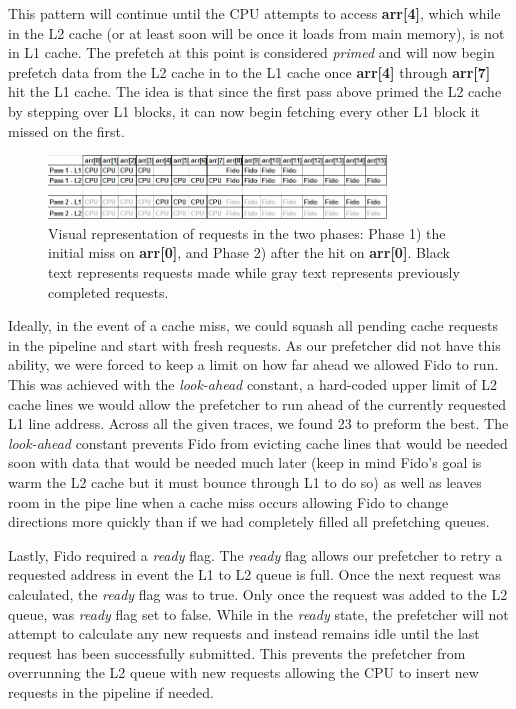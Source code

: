 \documentclass[11pt]{article}
\begin{document}
This pattern will continue until the CPU attempts to access \textbf{arr[4]}, which while in the L2 cache (or at least soon will be once it loads from main memory), is not in L1 cache. The prefetch at this point is considered \textit{primed} and will now begin prefetch data from the L2 cache in to the L1 cache once \textbf{arr[4]} through \textbf{arr[7]} hit the L1 cache. The idea is that since the first pass above primed the L2 cache by stepping over L1 blocks, it can now begin fetching every other L1 block it missed on the first.   
  
\begin{figure}[H]
\centering
\includegraphics[width=0.8\textwidth]{FidoExample.jpg}
\caption{\label{FidoEx}Visual representation of requests in the two phases: Phase 1) the initial miss on \textbf{arr[0]}, and Phase 2) after the hit on \textbf{arr[0]}. Black text represents requests made while gray text represents previously completed requests. }
\end{figure}

Ideally, in the event of a cache miss, we could squash all pending cache requests in the pipeline and start with fresh requests. As our prefetcher did not have this ability, we were forced to keep a limit on how far ahead we allowed Fido to run. This was achieved with the \textit{look-ahead} constant, a hard-coded upper limit of L2 cache lines we would allow the prefetcher to run ahead of the currently requested L1 line address. Across all the given traces, we found 23 to preform the best. The \textit{look-ahead} constant prevents Fido from evicting cache lines that would be needed soon with data that would be needed much later (keep in mind Fido's goal is warm the L2 cache but it must bounce through L1 to do so) as well as leaves room in the pipe line when a cache miss occurs allowing Fido to change directions more quickly than if we had completely filled all prefetching queues.

Lastly, Fido required a \textit{ready} flag. The \textit{ready} flag allows our prefetcher to retry a requested address in event the L1 to L2 queue is full. Once the next request was calculated, the \textit{ready} flag was to true. Only once the request was added to the L2 queue, was \textit{ready} flag set to false. While in the \textit{ready} state, the prefetcher will not attempt to calculate any new requests and instead remains idle until the last request has been successfully submitted. This prevents the prefetcher from overrunning the L2 queue with new requests allowing the CPU to insert new requests in the pipeline if needed.
\end{document}
